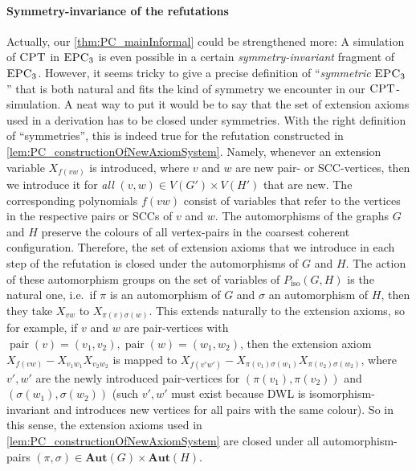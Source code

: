 \documentclass[10pt,a4paper]{article}
\newcommand{\CPT}{\mbox{\sc CPT}}
\newcommand{\Aut}{\mathbf{Aut}}
\newcommand{\EPC}{\mbox{\sc EPC}}
\newcommand{\pair}{{\operatorname{pair}}}
\newcommand{\Piso}{P_{\text{iso}}}
\begin{document}
	\paragraph*{Symmetry-invariance of the refutations}
	Actually, our \autoref{thm:PC_mainInformal} could be strengthened more: A simulation of $\CPT$ in $\EPC_3$ is even possible in a certain \emph{symmetry-invariant} fragment of $\EPC_3$. However, it seems tricky to give a precise definition of ``\emph{symmetric} $\EPC_3$'' that is both natural and fits the kind of symmetry we encounter in our $\CPT$-simulation. 
	A neat way to put it would be to say that the set of extension axioms used in a derivation has to be closed under symmetries. With the right definition of ``symmetries'', this is indeed true for the refutation constructed in \autoref{lem:PC_constructionOfNewAxiomSystem}. Namely, whenever an extension variable $X_{f(vw)}$ is introduced, where $v$ and $w$ are new pair- or SCC-vertices, then we introduce it for \emph{all} $(v,w) \in V(G') \times V(H')$ that are new. The corresponding polynomials $f(vw)$ consist of variables that refer to the vertices in the respective pairs or SCCs of $v$ and $w$. The automorphisms of the graphs $G$ and $H$ preserve the colours of all vertex-pairs in the coarsest coherent configuration. Therefore, the set of extension axioms that we introduce in each step of the refutation is closed under the automorphisms of $G$ and $H$. The action of these automorphism groups on the set of variables of $\Piso(G,H)$ is the natural one, i.e.\ if $\pi$ is an automorphism of $G$ and $\sigma$ an automorphism of $H$, then they take $X_{vw}$ to $X_{\pi(v)\sigma(w)}$. This extends naturally to the extension axioms, so for example, if $v$ and $w$ are pair-vertices with $\pair(v) = (v_1,v_2), \pair(w) = (w_1,w_2)$, then the extension axiom $X_{f(vw)} - X_{v_1w_1}X_{v_2w_2}$ is mapped to $X_{f(v'w')} - X_{\pi(v_1)\sigma(w_1)}X_{\pi(v_2)\sigma(w_2)}$, where $v',w'$ are the newly introduced pair-vertices for $(\pi(v_1),\pi(v_2))$ and $(\sigma(w_1),\sigma(w_2))$ (such $v',w'$ must exist because DWL is isomorphism-invariant and introduces new vertices for all pairs with the same colour). So in this sense, the extension axioms used in \autoref{lem:PC_constructionOfNewAxiomSystem} are closed under all automorphism-pairs $(\pi, \sigma) \in \Aut(G) \times \Aut(H)$.\\
\end{document}
